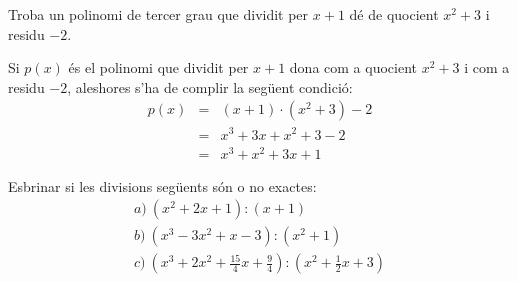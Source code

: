 \begin{exercici}
Troba un polinomi de tercer grau que dividit per $x+1$ dé de quocient
$x^{2}+3$ i residu $-2$.
\end{exercici}

\begin{solucio}
Si $p(x)$ és el polinomi que dividit per $x+1$ dona com a quocient $x^{2}+3$
i com a residu $-2$, aleshores s'ha de complir la següent condició:\begin{eqnarray*}
p(x) &=&(x+1)\cdot (x^{2}+3)-2 \\
&=&x^{3}+3x+x^{2}+3-2 \\
&=&x^{3}+x^{2}+3x+1
\end{eqnarray*}
\end{solucio}

\begin{exercici}
Esbrinar si les divisions següents són o no exactes:\[
\begin{array}{l}
a)~(x^{2}+2x+1):(x+1) \\
b)~(x^{3}-3x^{2}+x-3):(x^{2}+1) \\
c)~\left( x^{3}+2x^{2}+\frac{15}{4}x+\frac{9}{4}\right):\left( x^{2}+\frac{1}{2}x+3\right)\end{array}\]
\end{exercici}

